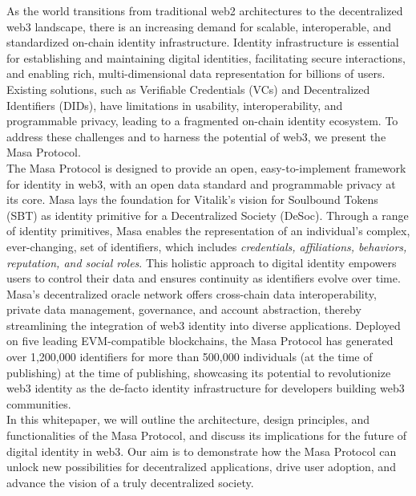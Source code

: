 \documentclass{article}
\begin{document}
As the world transitions from traditional web2 architectures to the decentralized web3 landscape, there is an increasing demand for scalable, interoperable, and standardized on-chain identity infrastructure. Identity infrastructure is essential for establishing and maintaining digital identities, facilitating secure interactions, and enabling rich, multi-dimensional data representation for billions of users. Existing solutions, such as Verifiable Credentials (VCs) and Decentralized Identifiers (DIDs), have limitations in usability, interoperability, and programmable privacy, leading to a fragmented on-chain identity ecosystem. To address these challenges and to harness the potential of web3, we present the Masa Protocol.
\\
\newline
The Masa Protocol is designed to provide an open, easy-to-implement framework for identity in web3, with an open data standard and programmable privacy at its core. Masa lays the foundation for Vitalik’s vision for Soulbound Tokens (SBT) as identity primitive for a Decentralized Society (DeSoc)\cite{vitalik2022}. Through a range of identity primitives, Masa enables the representation of an individual's complex, ever-changing, set of identifiers, which includes \emph{credentials, affiliations, behaviors, reputation, and social roles}. This holistic approach to digital identity empowers users to control their data and ensures continuity as identifiers evolve over time.
\\
\newline
Masa's decentralized oracle network offers cross-chain data interoperability, private data management, governance, and account abstraction, thereby streamlining the integration of web3 identity into diverse applications. Deployed on five leading EVM-compatible blockchains, the Masa Protocol has generated over 1,200,000 identifiers for more than 500,000 individuals (at the time of publishing) at the time of publishing, showcasing its potential to revolutionize web3 identity as the de-facto identity infrastructure for developers building web3 communities.
\\
\newline
In this whitepaper, we will outline the architecture, design principles, and functionalities of the Masa Protocol, and discuss its implications for the future of digital identity in web3. Our aim is to demonstrate how the Masa Protocol can unlock new possibilities for decentralized applications, drive user adoption, and advance the vision of a truly decentralized society.
\end{document}
